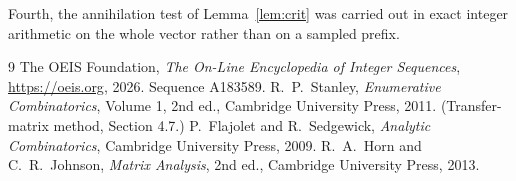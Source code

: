 \documentclass[11pt,a4paper]{article}
\theoremstyle{plain}
\theoremstyle{definition}
\begin{document}
Fourth, the annihilation test of Lemma~\ref{lem:crit} was carried out in exact integer
arithmetic on the whole vector rather than on a sampled prefix.

\begin{thebibliography}{9}
 The OEIS Foundation, \emph{The On-Line Encyclopedia of Integer
Sequences}, \url{https://oeis.org}, 2026. Sequence A183589.
 R.~P.~Stanley, \emph{Enumerative Combinatorics}, Volume 1, 2nd ed.,
Cambridge University Press, 2011. (Transfer-matrix method, Section 4.7.)
 P.~Flajolet and R.~Sedgewick, \emph{Analytic Combinatorics}, Cambridge
University Press, 2009.
 R.~A.~Horn and C.~R.~Johnson, \emph{Matrix Analysis}, 2nd ed., Cambridge
University Press, 2013.
\end{thebibliography}
\end{document}
